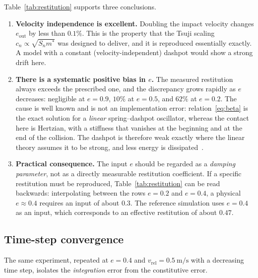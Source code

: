 Table~\ref{tab:restitution} supports three conclusions.

\begin{enumerate}[leftmargin=2.2em]
  \item \textbf{Velocity independence is excellent.}  Doubling the impact
        velocity changes $e_{\text{out}}$ by less than $0.1\%$.  This is the
        property that the Tsuji scaling $c_{n}\propto\sqrt{S_{n}m^{*}}$ was
        designed to deliver, and it is reproduced essentially exactly.  A model
        with a constant (velocity-independent) dashpot would show a strong
        drift here.
  \item \textbf{There is a systematic positive bias in $e$.}  The measured
        restitution always exceeds the prescribed one, and the discrepancy grows
        rapidly as $e$ decreases: negligible at $e=0.9$, $10\%$ at $e=0.5$, and
        $62\%$ at $e=0.2$.  The cause is well known and is not an implementation
        error: relation~\eqref{eq:beta} is the exact solution for a
        \emph{linear} spring--dashpot oscillator, whereas the contact here is
        Hertzian, with a stiffness that vanishes at the beginning and at the end
        of the collision.  The dashpot is therefore weak exactly where the
        linear theory assumes it to be strong, and less energy is
        dissipated~\cite{direnzo2004,thornton2013}.
  \item \textbf{Practical consequence.}  The input $e$ should be regarded as a
        \emph{damping parameter}, not as a directly measurable restitution
        coefficient.  If a specific restitution must be reproduced,
        Table~\ref{tab:restitution} can be read backwards: interpolating
        between the rows $e=0.2$ and $e=0.4$, a physical $e\approx0.4$ requires
        an input of about $0.3$.  The reference simulation uses $e=0.4$ as an
        input, which corresponds to an effective restitution of about $0.47$.
\end{enumerate}

\subsection{Time-step convergence}

The same experiment, repeated at $e=0.4$ and
$v_{\text{rel}}=\qty{0.5}{\metre\per\second}$ with a decreasing time step,
isolates the \emph{integration} error from the constitutive error.


